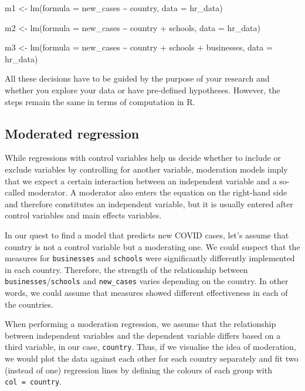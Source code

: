 \documentclass[
]{book}
\begin{document}
\leavevmode\hypertarget{four-hierarchical-regressions-nested}{}%
m1 \textless- lm(formula = new\_cases \textasciitilde{} country, data = hr\_data)

m2 \textless- lm(formula = new\_cases \textasciitilde{} country + schools, data = hr\_data)

m3 \textless- lm(formula = new\_cases \textasciitilde{} country + schools + businesses, data = hr\_data)

All these decisions have to be guided by the purpose of your research and whether you explore your data or have pre-defined hypotheses. However, the steps remain the same in terms of computation in R.

\hypertarget{moderated-regression}{%
\subsection{Moderated regression}\label{moderated-regression}}

While regressions with control variables help us decide whether to include or exclude variables by controlling for another variable, moderation models imply that we expect a certain interaction between an independent variable and a so-called moderator. A moderator also enters the equation on the right-hand side and therefore constitutes an independent variable, but it is usually entered after control variables and main effects variables.

In our quest to find a model that predicts new COVID cases, let's assume that country is not a control variable but a moderating one. We could suspect that the measures for \texttt{businesses} and \texttt{schools} were significantly differently implemented in each country. Therefore, the strength of the relationship between \texttt{businesses}/\texttt{schools} and \texttt{new\_cases} varies depending on the country. In other words, we could assume that measures showed different effectiveness in each of the countries.

When performing a moderation regression, we assume that the relationship between independent variables and the dependent variable differs based on a third variable, in our case, \texttt{country}. Thus, if we visualise the idea of moderation, we would plot the data against each other for each country separately and fit two (instead of one) regression lines by defining the colours of each group with \texttt{col\ =\ country}.
\end{document}
